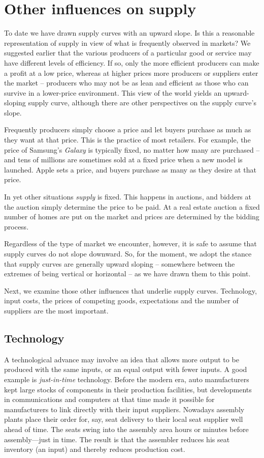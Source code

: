 \section{Other influences on supply}\label{sec:ch3sec5}

To date we have drawn supply curves with an upward slope. Is this a reasonable representation of supply in view of what is frequently observed in markets? We suggested earlier that the various producers of a particular good or service may have different levels of efficiency. If so, only the more efficient producers can make a profit at a low price, whereas at higher prices more producers or suppliers enter the market -- producers who may not be as lean and efficient as those who can survive in a lower-price environment. This view of the world yields an upward-sloping supply curve, although there are other perspectives on the supply curve's slope.

Frequently producers simply choose a price and let buyers purchase as much as they want at that price. This is the practice of most retailers. For example, the price of Samsung's \textit{Galaxy} is typically fixed, no matter how many are purchased -- and tens of millions are sometimes sold at a fixed price when a new model is launched. Apple sets a price, and buyers purchase as many as they desire at that price. 

In yet other situations \textit{supply} is fixed. This happens in auctions, and bidders at the auction simply determine the price to be paid. At a real estate auction a fixed number of homes are put on the market and prices are determined by the bidding process. 

Regardless of the type of market we encounter, however, it is safe to assume that supply curves do not slope downward. So, for the moment, we adopt the stance that supply curves are generally upward sloping -- somewhere between the extremes of being vertical or horizontal -- as we have drawn them to this point.

Next, we examine those other influences that underlie supply curves. Technology, input costs, the prices of competing goods, expectations and the number of suppliers are the most important.

\subsection*{Technology}

A technological advance may involve an idea that allows more output to be produced with the same inputs, or an equal output with fewer inputs. A good example is \textit{just-in-time} technology. Before the modern era, auto manufacturers kept large stocks of components in their production facilities, but developments in communications and computers at that time made it possible for manufacturers to link directly with their input suppliers. Nowadays assembly plants place their order for, say, seat delivery to their local seat supplier well ahead of time. The seats swing into the assembly area hours or minutes before assembly---just in time. The result is that the assembler reduces his seat inventory (an input) and thereby reduces production cost.

